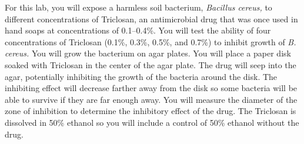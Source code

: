 \documentclass[12pt]{exam}
\begin{document}
For this lab, you will expose a harmless soil bacterium, \textit{Bacillus cereus,} to different concentrations of Triclosan, an antimicrobial drug that was once used in hand soaps at concentrations of 0.1–0.4\%. You will test the ability of four concentrations of Triclosan (0.1\%, 0.3\%, 0.5\%, and 0.7\%) to inhibit growth of \textit{B. cereus.} You will grow the bacterium on agar plates. You will place a paper disk soaked with Triclosan in the center of the agar plate. The drug will seep into the agar, potentially inhibiting the growth of the bacteria around the disk. The inhibiting effect will decrease farther away from the disk so some bacteria will be able to survive if they are far enough away. You will measure the diameter of the zone of inhibition to determine the inhibitory effect of the drug. The Triclosan is dissolved in 50\% ethanol so you will include a control of 50\% ethanol without the drug.
\end{document}
